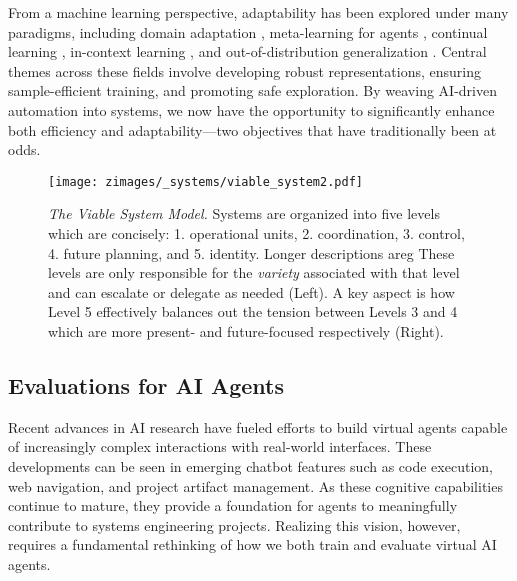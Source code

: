 From a machine learning perspective, adaptability has been explored under many paradigms, including domain adaptation \cite{redko2022domainadaptationtheory}, meta-learning for agents \cite{beck2024metareinforcementlearning}, continual learning \cite{wang2024continuallearning}, in-context learning \cite{dong2024incontextlearning}, and out-of-distribution generalization \cite{liu2023outofdistribution}. Central themes across these fields involve developing robust representations, ensuring sample-efficient training, and promoting safe exploration. By weaving AI-driven automation into systems, we now have the opportunity to significantly enhance both efficiency and adaptability—two objectives that have traditionally been at odds.

\begin{figure}[ht]
    \centering
    \texttt{[image: zimages/\_systems/viable\_system2.pdf]}
    \caption{\textit{The Viable System Model.} Systems are organized into five levels which are concisely: 1. operational units, 2. coordination, 3. control, 4. future planning, and 5. identity. Longer descriptions areg
    These levels are only responsible for the \textit{variety} associated with that level and can escalate or delegate as needed (Left). A key aspect is how Level 5 effectively balances out the tension between Levels 3 and 4 which are more present- and future-focused respectively (Right).}
    \label{fig:requisite_variety}
\end{figure}

\subsection{Evaluations for AI Agents}
Recent advances in AI research have fueled efforts to build virtual agents capable of increasingly complex interactions with real-world interfaces. These developments can be seen in emerging chatbot features such as code execution, web navigation, and project artifact management. As these cognitive capabilities continue to mature, they provide a foundation for agents to meaningfully contribute to systems engineering projects. Realizing this vision, however, requires a fundamental rethinking of how we both train and evaluate virtual AI agents.

